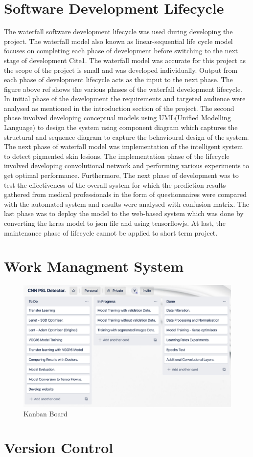 \section{Software Development Lifecycle}
The waterfall software development lifecycle was used during developing the project. The waterfall
model also known as linear-sequential life cycle model focuses on completing each phase of
development before switching to the next stage of development Cite{1}. The waterfall model was
accurate for this project as the scope of the project is small and was developed individually. Output
from each phase of development lifecycle acts as the input to the next phase. The figure above
ref{} shows the various phases of the waterfall development lifecycle. In initial phase of the
development the requirements and targeted audience were analysed as mentioned in the
introduction section of the project. The second phase involved developing conceptual models using
UML(Unified Modelling Language) to design the system using component diagram which captures
the structural and sequence diagram to capture the behavioural design of the system. The next
phase of waterfall model was implementation of the intelligent system to detect pigmented skin
lesions. The implementation phase of the lifecycle involved developing convolutional network and
performing various experiments to get optimal performance. Furthermore, The next phase of
development was to test the effectiveness of the overall system for which the prediction results
gathered from medical professionals in the form of questionnaires were compared with the
automated system and results were analysed with confusion matrix. The last phase was to deploy
the model to the web-based system which was done by converting the keras model to json file and
using tensorflowjs. At last, the maintenance phase of lifecycle cannot be applied to short term
project.

\pagebreak
\section{Work Managment System}
\begin{figure}[!htp]
    \centering
    \includegraphics[width=15cm]{Images/Kanban Bords.png}
    \caption{Kanban Board}
\end{figure}
\pagebreak
\section{Version Control}



